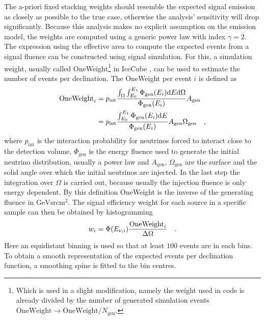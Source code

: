 The a-priori fixed stacking weights should resemble the expected signal emission as closely as possible to the true case, otherwise the analysis' sensitivity will drop significantly.
Because this analysis makes no explicit assumption on the emission model, the weights are computed using a generic power law with index $\gamma=2$.
The expression using the effective area to compute the expected events from a signal fluence can be constructed using signal simulation.
For this, a simulation weight, usually called OneWeight\footnote{Which is used in a slight modification, namely the weight used in code is already divided by the number of generated simulation events $\text{OneWeight}\rightarrow\text{OneWeight}/N_\text{gen}$.} in IceCube
, can be used to estimate the number of events per declination.
The OneWeight per event $i$ is defined as 
\begin{align}
  \text{OneWeight}_i
  &= p_\text{int}\frac{\int_\Omega\int_{E_0}^{E_1}
                       \Phi_\text{gen}(E_i)\mathrm{d}E\mathrm{d}\Omega
                       }{\Phi_\text{gen}(E_i)}A_\text{gen} \\
  &= p_\text{int}\frac{\int_{E_0}^{E_1}\Phi_\text{gen}(E_i)\mathrm{d}E}
                      {\Phi_\text{gen}(E_i)}
    A_\text{gen}\Omega_\text{gen}
  \quad\text{,}
\end{align}
where $p_\text{int}$ is the interaction probability for neutrinos forced to interact close to the detection volume, $\Phi_\text{gen}$ is the energy fluence used to generate the initial neutrino distribution, usually a power law and $A_\text{gen}$, $\Omega_\text{gen}$ are the surface and the solid angle over which the initial neutrinos are injected.
In the last step the integration over $\Omega$ is carried out, because usually the injection fluence is only energy dependent.
By this definition OneWeight is the inverse of the generating fluence in $\si{\GeV\steradian\cm\squared}$.
The signal efficiency weight for each source in a specific sample can then be obtained by histogramming
\begin{equation}
  w_i = \Phi(E_{\nu,i})\frac{\text{OneWeight}_i}{\Delta\Omega}
  \quad\text{.}
\end{equation}
Here an equidistant binning is used so that at least $100$ events are in each bins.
To obtain a smooth representation of the expected events per declination function, a smoothing spine is fitted to the bin centres.


